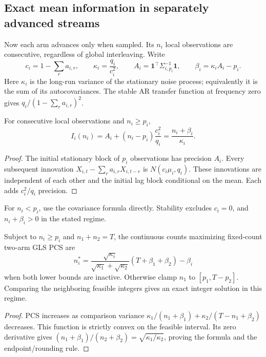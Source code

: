 \subsection{Exact mean information in separately advanced streams}
Now each arm advances only when sampled. Its $n_i$ local observations are consecutive, regardless of global interleaving. Write
\begin{equation}
c_i=1-\sum_ra_{i,r},\qquad
\kappa_i=\frac{q_i}{c_i^2},\qquad
A_i=\mathbf1^\top\Sigma_{i,p_i}^{-1}\mathbf1,\qquad
\beta_i=\kappa_iA_i-p_i.
\end{equation}
Here $\kappa_i$ is the long-run variance of the stationary noise process; equivalently it is the sum of its autocovariances. The stable AR transfer function at frequency zero gives $q_i/(1-\sum_ra_{i,r})^2$.

\begin{theorem}
For consecutive local observations and $n_i\geq p_i$,
\begin{equation}
\boxed{I_i(n_i)=A_i+(n_i-p_i)\frac{c_i^2}{q_i}
=\frac{n_i+\beta_i}{\kappa_i}.}
\label{ar_p_bandits:eq:affine}
\end{equation}
\end{theorem}
\begin{proof}
The initial stationary block of $p_i$ observations has precision $A_i$. Every subsequent innovation
$X_{i,t}-\sum_ra_{i,r}X_{i,t-r}$ is $N(c_i\mu_i,q_i)$. These innovations are independent of each other and the initial lag block conditional on the mean. Each adds $c_i^2/q_i$ precision.
\end{proof}
For $n_i<p_i$, use the covariance formula directly. Stability excludes $c_i=0$, and $n_i+\beta_i>0$ in the stated regime.

\begin{corollary}
Subject to $n_i\geq p_i$ and $n_1+n_2=T$, the continuous counts maximizing fixed-count two-arm GLS PCS are
\begin{equation}
n_i^*=\frac{\sqrt{\kappa_i}}{\sqrt{\kappa_1}+\sqrt{\kappa_2}}
(T+\beta_1+\beta_2)-\beta_i
\end{equation}
when both lower bounds are inactive. Otherwise clamp $n_1$ to $[p_1,T-p_2]$. Comparing the neighboring feasible integers gives an exact integer solution in this regime.
\end{corollary}
\begin{proof}
PCS increases as comparison variance
$\kappa_1/(n_1+\beta_1)+\kappa_2/(T-n_1+\beta_2)$ decreases. This function is strictly convex on the feasible interval. Its zero derivative gives $(n_1+\beta_1)/(n_2+\beta_2)=\sqrt{\kappa_1/\kappa_2}$, proving the formula and the endpoint/rounding rule.
\end{proof}

